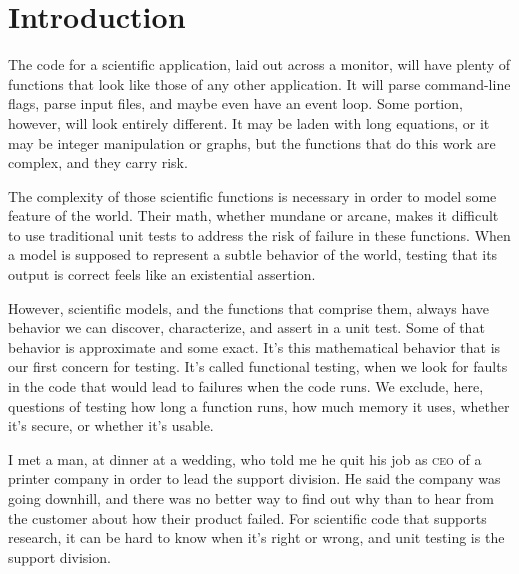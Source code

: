 \documentclass[fleqn,10pt]{olplainarticle}
\begin{document}


\flushbottom
\maketitle
\thispagestyle{empty}

\tableofcontents
\section{Introduction}\label{sec:introduction}


The code for a scientific application, laid out across a monitor,
will have plenty of functions that look like those of any other application.
It will parse command-line flags, parse input files, and maybe even have
an event loop. Some portion, however, will look entirely different. It
may be laden with long equations, or it may be integer manipulation or
graphs, but the functions that do this work are complex, and they carry risk.

The complexity of those scientific functions is necessary
in order to model some feature of the world. Their math, whether mundane
or arcane, makes it difficult to use traditional unit tests to address
the risk of failure in these functions. When a model is supposed to represent
a subtle behavior of the world, testing that its output is correct feels
like an existential assertion.

However, scientific models, and the functions that comprise them,
always have behavior we can discover, characterize, and assert in a unit
test. Some of that behavior is approximate and some exact.
It's this mathematical behavior that is our first concern for testing.
It's called functional testing, when we look for faults in the code
that would lead to failures when the code runs. We exclude, here,
questions of testing how long a function runs, how much memory it uses,
whether it's secure, or whether it's usable.

I met a man, at dinner at a wedding, who told me he quit his
job as \textsc{ceo} of a printer company in order to lead
the support division. He said the company was going downhill,
and there was no better way to find out why than to hear from
the customer about how their product failed.
For scientific code that supports research, it can be hard to
know when it's right or wrong, and unit testing is the
support division.
\end{document}
